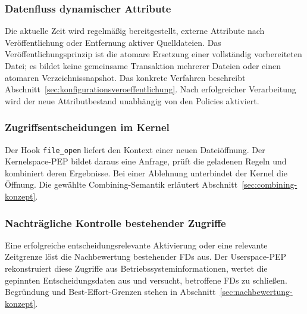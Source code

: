 \subsubsection{Datenfluss dynamischer Attribute}
Die aktuelle Zeit wird regelmäßig bereitgestellt, externe Attribute nach Veröffentlichung oder Entfernung aktiver Quelldateien. Das Veröffentlichungsprinzip ist die atomare Ersetzung einer vollständig vorbereiteten Datei; es bildet keine gemeinsame Transaktion mehrerer Dateien oder einen atomaren Verzeichnissnapshot. Das konkrete Verfahren beschreibt Abschnitt~\ref{sec:konfigurationsveroeffentlichung}. Nach erfolgreicher Verarbeitung wird der neue Attributbestand unabhängig von den Policies aktiviert.

\subsubsection{Zugriffsentscheidungen im Kernel}
Der Hook \texttt{file\_open} liefert den Kontext einer neuen Dateiöffnung. Der Kernelspace-PEP bildet daraus eine Anfrage, prüft die geladenen Regeln und kombiniert deren Ergebnisse. Bei einer Ablehnung unterbindet der Kernel die Öffnung. Die gewählte Combining-Semantik erläutert Abschnitt~\ref{sec:combining-konzept}.

\subsubsection{Nachträgliche Kontrolle bestehender Zugriffe}
Eine erfolgreiche entscheidungsrelevante Aktivierung oder eine relevante Zeitgrenze löst die Nachbewertung bestehender FDs aus. Der Userspace-PEP rekonstruiert diese Zugriffe aus Betriebssysteminformationen, wertet die gepinnten Entscheidungsdaten aus und versucht, betroffene FDs zu schließen. Begründung und Best-Effort-Grenzen stehen in Abschnitt~\ref{sec:nachbewertung-konzept}.

